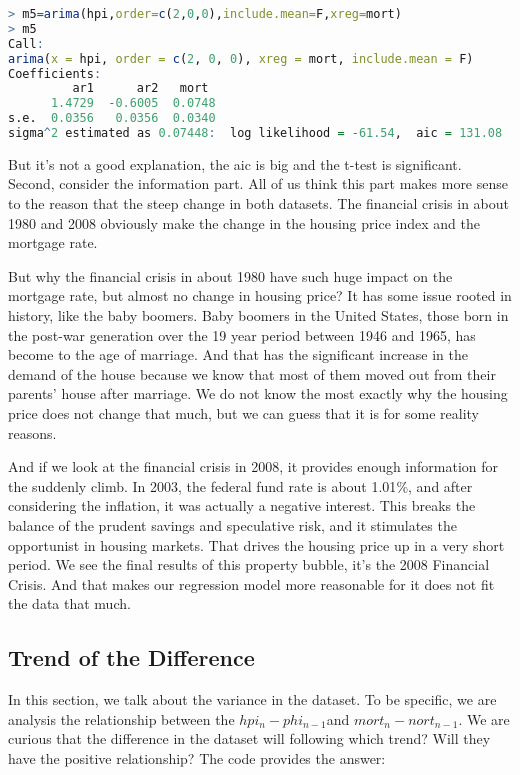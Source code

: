 \documentclass[12pt,letterpaper]{article}
\begin{document}
{\footnotesize
\begin{lstlisting}[language=R]
> m5=arima(hpi,order=c(2,0,0),include.mean=F,xreg=mort)
> m5
Call:
arima(x = hpi, order = c(2, 0, 0), xreg = mort, include.mean = F)
Coefficients:
         ar1      ar2   mort
      1.4729  -0.6005  0.0748
s.e.  0.0356   0.0356  0.0340
sigma^2 estimated as 0.07448:  log likelihood = -61.54,  aic = 131.08
\end{lstlisting}
}

But it's not a good explanation, the aic is big and the t-test is significant.\\

Second, consider the information part. 
All of us think this part makes more sense to the reason that the steep change in both datasets.
The financial crisis in about 1980 and 2008 obviously make the change in the housing price index and the mortgage rate.

But why the financial crisis in about 1980 have such huge impact on the mortgage rate, but almost no change in housing price?
It has some issue rooted in history, like the baby boomers.
Baby boomers in the United States, those born in the post-war generation over the 19 year period between 1946 and 1965, has become to the age of marriage.
And that has the significant increase in the demand of the house because we know that most of them moved out from their parents' house after marriage.
We do not know the most exactly why the housing price does not change that much, but we can guess that it is for some reality reasons.

And if we look at the financial crisis in 2008, it provides enough information for the suddenly climb.
In 2003, the federal fund rate is about 1.01$\%$, and after considering the inflation, it was actually a negative interest.
This breaks the balance of the prudent savings and speculative risk, and it stimulates the opportunist in housing markets.
That drives the housing price up in a very short period.
We see the final results of this property bubble, it's the 2008 Financial Crisis.
And that makes our regression model more reasonable for it does not fit the data that much.

\subsection{Trend of the Difference}

In this section, we talk about the variance in the dataset.
To be specific, we are analysis the relationship between the $hpi_n-phi_{n-1}$and $mort_n-nort_{n-1}$.
We are curious that the difference in the dataset will following which trend? 
Will they have the positive relationship? 
The code provides the answer: 
\end{document}

